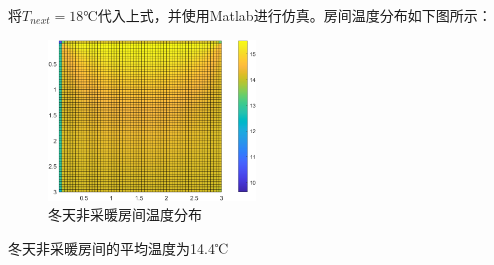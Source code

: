 将$T_{next}=18℃$代入上式，并使用Matlab进行仿真。房间温度分布如下图所示：
\\
\begin{figure}[h]
    \centering
    \includegraphics[width = 5.5cm]{figures/mainroom-winter.png}
    \caption{冬天非采暖房间温度分布}
    \label{冬天非采暖房间温度分布l}
\end{figure}
冬天非采暖房间的平均温度为14.4℃